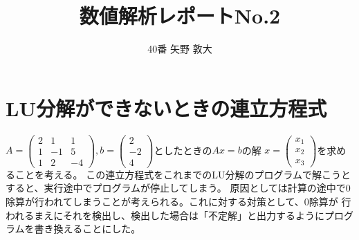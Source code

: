 \documentclass[titlepage]{jsarticle}
\begin{document}
\title{数値解析レポートNo.2}
\author{40番 矢野 敦大}
\date{}
\maketitle
	\section{LU分解ができないときの連立方程式}
		$\displaystyle
	            A = \left(
	                \begin{array}{ccc}
	                    2 & 1 & 1 \\
	                    1 & -1 & 5 \\
	                    1 & 2 & -4
	                \end{array}
	            \right), b = \left(
	                \begin{array}{c}
	                    2 \\
	                    -2 \\
	                    4
	                \end{array}
	            \right)
      		$としたときの$Ax = b$の解
		$
			 x = \left(
	                \begin{array}{c}
	                    x_1 \\
	                    x_2 \\
	                    x_3
	                \end{array}
	            \right)
		$を求めることを考える。
		この連立方程式をこれまでのLU分解のプログラムで解こうとすると、実行途中でプログラムが停止してしまう。
		原因としては計算の途中で0除算が行われてしまうことが考えられる。これに対する対策として、0除算が
		行われるまえにそれを検出し、検出した場合は「不定解」と出力するようにプログラムを書き換えることにした。
\end{document}
